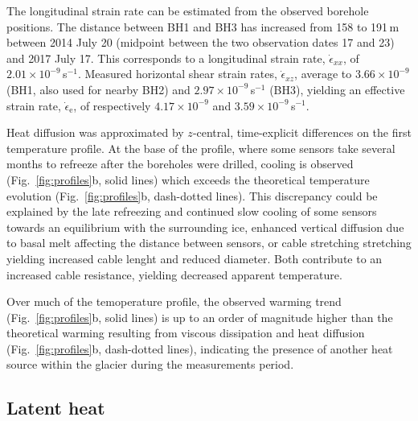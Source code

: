 \documentclass[utf8]{article}
\begin{document}
    The longitudinal strain rate can be estimated from the observed borehole
    positions. The distance between BH1 and BH3
    has increased from 158 to 191\,m between 2014 July 20 (midpoint
    between the two observation dates 17 and 23) and 2017 July 17. This
    corresponds to a longitudinal strain rate, $\dot\epsilon_{xx}$, of
    $2.01\times10^{-9}$\,s$^{-1}$. Measured horizontal shear strain rates,
    $\dot\epsilon_{xz}$, average to $3.66\times10^{-9}$ (BH1, also used for
    nearby BH2) and $2.97\times10^{-9}$\,s$^{-1}$ (BH3), yielding an effective
    strain rate, $\dot\epsilon_\mathrm{e}$, of respectively $4.17\times10^{-9}$ and
    $3.59\times10^{-9}$\,s$^{-1}$.

    Heat diffusion was approximated by $z$-central, time-explicit differences
    on the first temperature profile. At the base of the profile, where
    some sensors take several months to refreeze after the boreholes were
    drilled, cooling is observed (Fig.~\ref{fig:profiles}b, solid lines) which
    exceeds the theoretical temperature evolution (Fig.~\ref{fig:profiles}b,
    dash-dotted lines). This discrepancy could be explained by the late
    refreezing and continued slow cooling of some sensors towards an equilibrium
    with the surrounding ice, enhanced vertical diffusion due to basal melt
    affecting the distance between sensors, or cable stretching stretching
    yielding increased cable lenght and reduced diameter. Both contribute to an
    increased cable resistance, yielding decreased apparent temperature.

    Over much of the temoperature profile, the observed warming trend
    (Fig.~\ref{fig:profiles}b, solid lines) is up to an order of magnitude
    higher than the theoretical warming resulting from viscous
    dissipation and heat diffusion (Fig.~\ref{fig:profiles}b, dash-dotted
    lines), indicating the presence of another heat source within the glacier
    during the measurements period.


\subsection{Latent heat}
\end{document}
